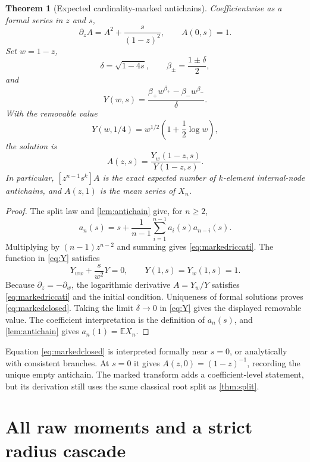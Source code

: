 \documentclass[10pt,a4paper]{amsart}
\newtheorem{theorem}{Theorem}[section]
\theoremstyle{definition}
\theoremstyle{remark}
\newcommand{\E}{\mathbb E}
\begin{document}
\begin{theorem}[Expected cardinality-marked antichains]\label{thm:marked}
Coefficientwise as a formal series in $z$ and $s$,
\begin{equation}\label{eq:markedriccati}
 \partial_z A=A^2+\frac{s}{(1-z)^2},\qquad A(0,s)=1.
\end{equation}
Set $w=1-z$,
\[
 \delta=\sqrt{1-4s},\qquad
 \beta_\pm=\frac{1\pm\delta}{2},
\]
and
\begin{equation}\label{eq:Y}
 Y(w,s)=\frac{\beta_+w^{\beta_+}-\beta_-w^{\beta_-}}{\delta}.
\end{equation}
With the removable value
\[
 Y(w,1/4)=w^{1/2}\left(1+\frac12\log w\right),
\]
the solution is
\begin{equation}\label{eq:markedclosed}
                     A(z,s)=\frac{Y_w(1-z,s)}{Y(1-z,s)}.
\end{equation}
In particular, $[z^{n-1}s^k]A$ is the exact expected number of
$k$-element internal-node antichains, and $A(z,1)$ is the mean series of
$X_n$.
\end{theorem}

\begin{proof}
The split law and \cref{lem:antichain} give, for $n\geq2$,
\begin{equation}\label{eq:markedrec}
 a_n(s)=s+\frac1{n-1}\sum_{i=1}^{n-1}a_i(s)a_{n-i}(s).
\end{equation}
Multiplying by $(n-1)z^{n-2}$ and summing gives
\eqref{eq:markedriccati}.  The function in \eqref{eq:Y} satisfies
\[
 Y_{ww}+\frac{s}{w^2}Y=0,\qquad Y(1,s)=Y_w(1,s)=1.
\]
Because $\partial_z=-\partial_w$, the logarithmic derivative
$A=Y_w/Y$ satisfies \eqref{eq:markedriccati} and the initial condition.
Uniqueness of formal solutions proves \eqref{eq:markedclosed}.  Taking the
limit $\delta\to0$ in \eqref{eq:Y} gives the displayed removable value.
The coefficient interpretation is the definition of $a_n(s)$, and
\cref{lem:antichain} gives $a_n(1)=\E X_n$.
\end{proof}

Equation \eqref{eq:markedclosed} is interpreted formally near $s=0$, or
analytically with consistent branches.  At $s=0$ it gives
$A(z,0)=(1-z)^{-1}$, recording the unique empty antichain.  The marked
transform adds a coefficient-level statement, but its derivation still uses
the same classical root split as \cref{thm:split}.

\section{All raw moments and a strict radius cascade}
\end{document}
